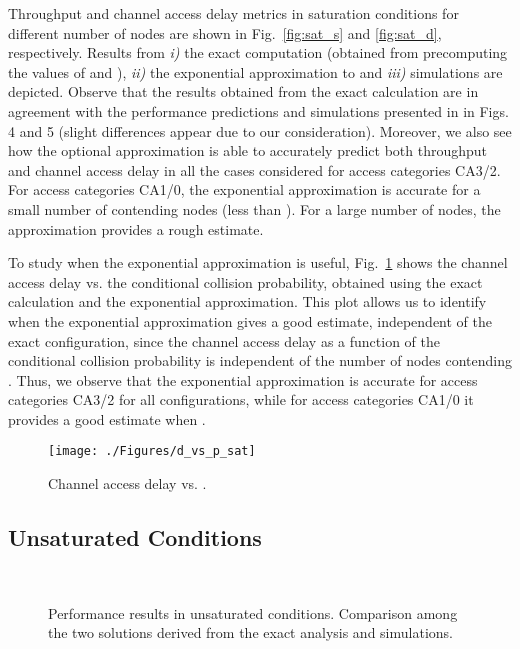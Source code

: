 \documentclass[preprint,12pt]{elsarticle}
\begin{document}
Throughput and channel access delay metrics in saturation conditions for different number of nodes are shown in Fig.~\ref{fig:sat_s} and \ref{fig:sat_d}, respectively. Results from \emph{i)} the exact computation (obtained from precomputing the values of  and ), \emph{ii)} the exponential approximation to  and \emph{iii)} simulations are depicted. Observe that the results obtained from the exact calculation are in agreement with the performance predictions and simulations presented in \cite{chung2006performance} in Figs. 4 and 5 (slight differences appear due to our  consideration). Moreover, we also see how the optional approximation is able to accurately predict both throughput and channel access delay in all the cases considered for access categories CA3/2. For access categories CA1/0, the exponential approximation is accurate for a small number of contending nodes (less than ). For a large number of nodes, the approximation 
provides a rough estimate. 

To study when the exponential approximation is useful, Fig.~\ref{fig:sat_d_vs_p} shows the channel access delay vs. the conditional collision probability, obtained using the exact calculation and the exponential approximation. This plot allows us to identify when the exponential approximation gives a good estimate, independent of the exact configuration, since the channel access delay as a function of the conditional collision probability is independent of the number of nodes contending \cite{malone2007modeling}. Thus, we observe that the exponential approximation is accurate for access categories CA3/2 for all configurations, while for access categories CA1/0 it provides a good estimate when .

\begin{figure}[!tb]
\centering
\texttt{[image: ./Figures/d\_vs\_p\_sat]}
\caption{Channel access delay vs. .}
\label{fig:sat_d_vs_p}
\end{figure}

\subsection{Unsaturated Conditions}

\begin{figure*}[!tb]
\centering
{}
\\
\caption{Performance results in unsaturated conditions. Comparison among the two solutions derived from the exact analysis and simulations.}
\label{fig:unsat}
\end{figure*}
\end{document}
